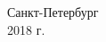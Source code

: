 \begin{titlepage}
\begin{large}
                \begin{center}
                        \vspace{\fill}
                        Санкт-Петербург\\
                        2018 г.
                \end{center}
        \end{large}
\end{titlepage}

